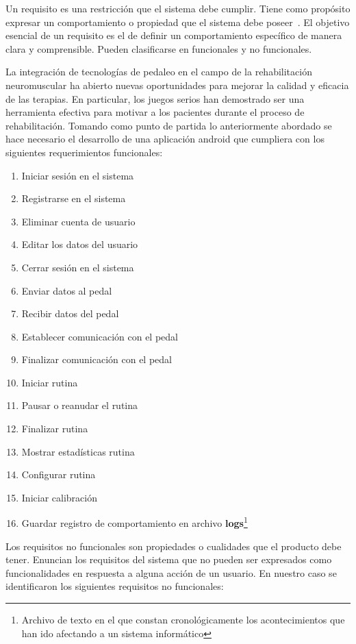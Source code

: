 Un requisito es una restricción que el sistema debe cumplir. Tiene como propósito expresar un comportamiento o propiedad que el sistema debe poseer~\cite{jacobson2000uml}. El objetivo esencial de un requisito es el de definir un comportamiento específico de manera clara y comprensible. Pueden clasificarse en funcionales y no funcionales.

La integración de tecnologías de pedaleo en el campo de la rehabilitación neuromuscular ha abierto nuevas oportunidades para mejorar la calidad y eficacia de las terapias. En particular, los juegos serios han demostrado ser una herramienta efectiva para motivar a los pacientes durante el proceso de rehabilitación. Tomando como punto de partida lo anteriormente abordado se hace necesario el desarrollo de una aplicación android que cumpliera con los siguientes requerimientos funcionales:    

\begin{enumerate}
    \item Iniciar sesión en el sistema
    \item Registrarse en el sistema
    \item Eliminar cuenta de usuario
    \item Editar los datos del usuario
    \item Cerrar sesión en el sistema
    \item Enviar datos al pedal
    \item Recibir datos del pedal
    \item Establecer comunicación con el pedal
    \item Finalizar comunicación con el pedal
    \item Iniciar rutina
    \item Pausar o reanudar el rutina
    \item Finalizar rutina
    \item Mostrar estadísticas rutina
    \item Configurar rutina
    \item Iniciar calibración
    \item Guardar registro de comportamiento en archivo \textbf{logs}\footnote{Archivo de texto en el que constan cronológicamente los acontecimientos que han ido afectando a un sistema informático}
\end{enumerate}


Los requisitos no funcionales son propiedades o cualidades que el producto debe tener. Enuncian los requisitos del sistema que no pueden ser expresados como funcionalidades en respuesta a alguna acción de un usuario. En nuestro caso se identificaron los siguientes requisitos no funcionales:
        
